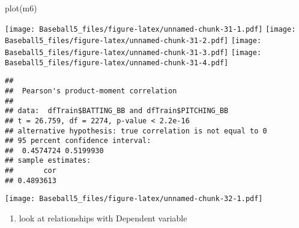 \documentclass[
]{article}
\newenvironment{Shaded}{\begin{snugshade}}{\end{snugshade}}
\newcommand{\FunctionTok}[1]{\textcolor[rgb]{0.00,0.00,0.00}{#1}}
\newcommand{\NormalTok}[1]{#1}
\newcommand{\SpecialCharTok}[1]{\textcolor[rgb]{0.00,0.00,0.00}{#1}}
\providecommand{\tightlist}{%
  \setlength{\itemsep}{0pt}\setlength{\parskip}{0pt}}
\begin{document}
\begin{Shaded}
\begin{Highlighting}[]
\FunctionTok{plot}\NormalTok{(m6)}
\end{Highlighting}
\end{Shaded}

\texttt{[image: Baseball5\_files/figure-latex/unnamed-chunk-31-1.pdf]}
\texttt{[image: Baseball5\_files/figure-latex/unnamed-chunk-31-2.pdf]}
\texttt{[image: Baseball5\_files/figure-latex/unnamed-chunk-31-3.pdf]}
\texttt{[image: Baseball5\_files/figure-latex/unnamed-chunk-31-4.pdf]}

\begin{Shaded}
\end{Shaded}

\begin{verbatim}
## 
##  Pearson's product-moment correlation
## 
## data:  dfTrain$BATTING_BB and dfTrain$PITCHING_BB
## t = 26.759, df = 2274, p-value < 2.2e-16
## alternative hypothesis: true correlation is not equal to 0
## 95 percent confidence interval:
##  0.4574724 0.5199930
## sample estimates:
##       cor 
## 0.4893613
\end{verbatim}

\begin{Shaded}
\end{Shaded}

\texttt{[image: Baseball5\_files/figure-latex/unnamed-chunk-32-1.pdf]}

\begin{enumerate}
\def\labelenumi{\alph{enumi}.}
\setcounter{enumi}{2}
\tightlist
\item
  look at relationships with Dependent variable
\end{enumerate}
\end{document}
